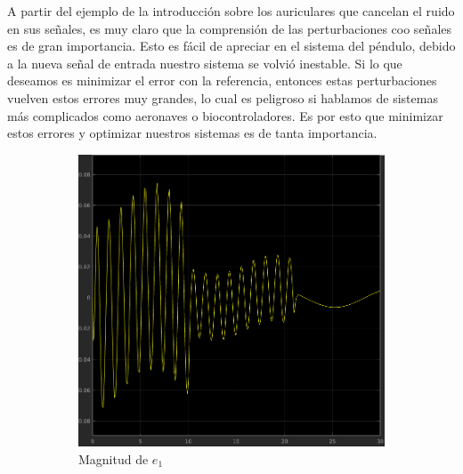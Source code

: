 \documentclass[12pt, letterpaper]{article}
\begin{document}
A partir del ejemplo de la introducción sobre los auriculares que cancelan el ruido en sus señales, es muy claro que la comprensión de las perturbaciones coo señales es de gran importancia. Esto es fácil de apreciar en el sistema del péndulo, debido a la nueva señal de entrada nuestro sistema se volvió inestable. Si lo que deseamos es minimizar el error con la referencia, entonces estas perturbaciones vuelven estos errores muy grandes, lo cual es peligroso si hablamos de sistemas más complicados como aeronaves o biocontroladores. Es por esto que minimizar estos errores y optimizar nuestros sistemas es de tanta importancia.

\begin{figure}[H]
	\centering
	\begin{subfigure}[b]{0.49\linewidth}
		\includegraphics[width=\linewidth]{e1.png}
		\caption{Magnitud de $e_1$}
	\end{subfigure}
	\begin{subfigure}[b]{0.49\linewidth}

\end{subfigure}
\end{figure}
\end{document}
